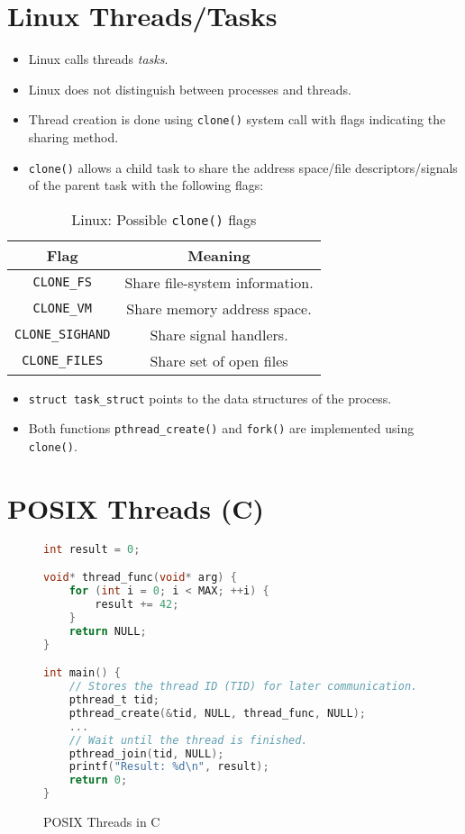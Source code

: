 \documentclass[a4paper, 11pt, accentcolor = tud3b]{tudreport}
\begin{document}
        \section{Linux Threads/Tasks}
            \begin{itemize}
            	\item Linux calls threads \textit{tasks}.
            	\item Linux does not distinguish between processes and threads.
            	\item Thread creation is done using \texttt{clone()} system call with flags indicating the sharing method.
            	\item \texttt{clone()} allows a child task to share the address space/file descriptors/signals of the parent task with the following flags:
            \end{itemize}
	        \begin{table}[H]
	        	\centering
	        	\begin{tabular}{c | c}
	        		         Flag           & Meaning                        \\ \hline
	        		  \texttt{CLONE\_FS}    & Share file-system information. \\
	        		  \texttt{CLONE\_VM}    & Share memory address space.    \\
	        		\texttt{CLONE\_SIGHAND} & Share signal handlers.         \\
	        		 \texttt{CLONE\_FILES}  & Share set of open files
	        	\end{tabular}
	        	\caption{Linux: Possible \texttt{clone()} flags}
	        \end{table}
	        \begin{itemize}
	        	\item \texttt{struct task\_struct} points to the data structures of the process.
	        	\item Both functions \texttt{pthread\_create()} and \texttt{fork()} are implemented using \texttt{clone()}.
	        \end{itemize}

        \section{POSIX Threads (C)}
            \begin{figure}[H]
            	\centering
            	\begin{lstlisting}[language = C]
int result = 0;

void* thread_func(void* arg) {
	for (int i = 0; i < MAX; ++i) {
		result += 42;
	}
	return NULL;
}

int main() {
	// Stores the thread ID (TID) for later communication.
	pthread_t tid;
	pthread_create(&tid, NULL, thread_func, NULL);
	...
	// Wait until the thread is finished.
	pthread_join(tid, NULL);
	printf("Result: %d\n", result);
	return 0;
}
\end{lstlisting}
            	\caption{POSIX Threads in C}
            \end{figure}
\end{document}
